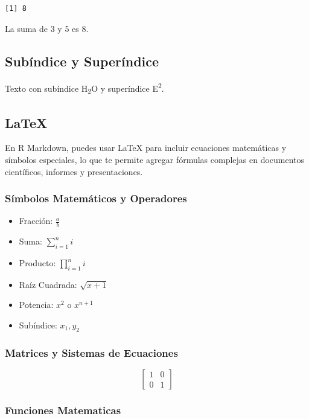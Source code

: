 \documentclass[
  10pt,
]{article}
\providecommand{\tightlist}{%
  \setlength{\itemsep}{0pt}\setlength{\parskip}{0pt}}\usepackage{longtable,booktabs,array}
\begin{document}
\begin{verbatim}
[1] 8
\end{verbatim}

La suma de 3 y 5 es 8.

\subsection{Subíndice y
Superíndice}\label{subuxedndice-y-superuxedndice}

Texto con subíndice H\textsubscript{2}O y superíndice
E\textsuperscript{2}.

\subsection{LaTeX}\label{latex}

En R Markdown, puedes usar LaTeX para incluir ecuaciones matemáticas y
símbolos especiales, lo que te permite agregar fórmulas complejas en
documentos científicos, informes y presentaciones.

\subsubsection{Símbolos Matemáticos y
Operadores}\label{suxedmbolos-matemuxe1ticos-y-operadores}

\begin{itemize}
\tightlist
\item
  Fracción: \(\frac{a}{b}\)
\item
  Suma: \(\sum_{i=1}^{n} i\)
\item
  Producto: \(\prod_{i=1}^{n} i\)
\item
  Raíz Cuadrada: \(\sqrt{x+1}\)
\item
  Potencia: \(x^2\) o \(x^{n+1}\)
\item
  Subíndice: \(x_1, y_2\)
\end{itemize}

\subsubsection{Matrices y Sistemas de
Ecuaciones}\label{matrices-y-sistemas-de-ecuaciones}

\[
\begin{bmatrix}
1 & 0 \\
0 & 1
\end{bmatrix}
\]

\subsubsection{Funciones Matematicas}\label{funciones-matematicas}
\end{document}
